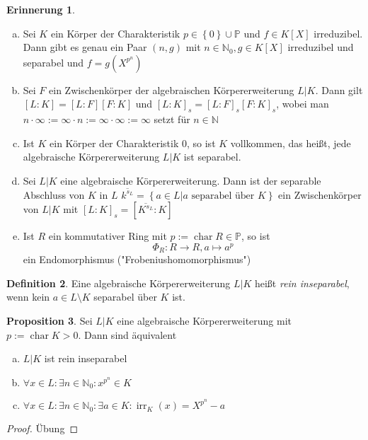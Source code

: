 \documentclass[
twoside=semi,
fontsize=12,
DIV=12, 
cleardoublepage=current,
leqno,
headings=optiontoheadandtoc, 
toc=idx
]{scrbook}
\newcommand{\N}{\mathbb{N}}
\renewcommand{\P}{\mathbb{P}}
\newcommand{\set}[1]{\left\{ #1 \right\}}
\DeclareMathOperator{\irr}{irr}
\DeclareMathOperator{\Char}{char}
\theoremstyle{definition}
\newtheorem{definition}{Definition}[section]
\newtheorem{proposition}[definition]{Proposition}
\newtheorem{erinnerung}[definition]{Erinnerung}
\begin{document}
	\begin{erinnerung}\label{2.4.7}
		\begin{enumerate}[(a)]
			\item Sei $K$ ein K\"orper der Charakteristik $p \in \set{0} \cup \P$ und $f \in K[X]$ irreduzibel. Dann gibt es genau ein Paar $(n,g)$ mit $n \in \N_0, g \in K[X]$ irreduzibel und separabel und $f = g(X^{p^n})$
			
			\item Sei $F$ ein Zwischenk\"orper der algebraischen K\"orpererweiterung $L|K$. Dann gilt $[L:K]=[L:F][F:K]$ und 
			$[L:K]_s = [L:F]_s[F:K]_s$, wobei man $n\cdot \infty := \infty \cdot n := \infty \cdot \infty := \infty$ setzt f\"ur $n \in \N$
			
			\item Ist $K$ ein K\"orper der Charakteristik $0$, so ist $K$ vollkommen, das hei\ss t, jede algebraische K\"orpererweiterung $L|K$ ist separabel.
			
			\item Sei $L|K$ eine algebraische K\"orpererweiterung. Dann ist der separable Abschluss von $K$ in $L$ $\overline{k^{s_L}} = \set{a \in L| a \textrm{ separabel \"uber } K}$ ein
			Zwischenk\"orper von $L|K$ mit $[L:K]_s = [\overline{K^{s_L}}:K]$
			
			\item Ist $R$ ein kommutativer Ring mit $p:= \Char R \in \P$, so ist 
				\[\Phi_R: R  \to R, a \mapsto a^p\]
			ein Endomorphismus ("Frobeniushomomorphismus")
		\end{enumerate}
	\end{erinnerung}

	\begin{definition}\label{2.4.8}
		Eine algebraische K\"orpererweiterung $L|K$ hei\ss t \emph{rein inseparabel}, wenn kein $a \in L \setminus K$ separabel \"uber $K$ ist.
	\end{definition}

	\begin{proposition}\label{2.4.9}
		Sei $L|K$ eine algebraische K\"orpererweiterung mit $p:= \Char K > 0$. Dann sind \"aquivalent
		\begin{enumerate}[(a)]
			\item $L|K$ ist rein inseparabel
			\item $\forall x \in L: \exists n \in \N_0: x^{p^n} \in K$
			\item $\forall x \in L: \exists n \in \N_0: \exists a \in K: \irr_K(x) = X^{p^n} - a$
		\end{enumerate}
	
		\begin{proof}
			\"Ubung
		\end{proof}
	\end{proposition}
\end{document}

